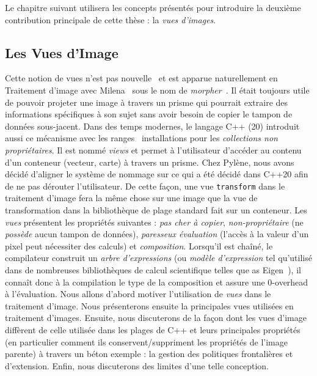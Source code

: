 Le chapitre suivant utilisera les concepts présentés pour introduire la deuxième contribution principale de cette thèse : la
\emph{vues d'images}.


\subsection*{Les Vues d'Image}


Cette notion de vues n'est pas nouvelle~\parencite{novak.1997.reuse} et est apparue naturellement en Traitement d'image avec
Milena~\parencite{geraud.2012.ipolmeeting,levillain.2010.icip} sous le nom de
\emph{morpher}~\parencite{levillain.2009.ismm, geraud.2012.hdr}. Il était toujours utile de pouvoir projeter une image
à travers un prisme qui pourrait extraire des informations spécifiques à son sujet sans avoir besoin de copier le tampon de données sous-jacent. Dans
des temps modernes, le langage C++ (20) introduit aussi ce mécanisme avec les ranges~\parencite{niebler.2014.ranges}
installations pour les \emph{collections non propriétaires}. Il est nommé \emph{views} et permet à l'utilisateur d'accéder au contenu d'un
conteneur (vecteur, carte) à travers un prisme. Chez Pylène, nous avons décidé d'aligner le système de nommage sur ce qui a été décidé dans
C++20 afin de ne pas dérouter l'utilisateur. De cette façon, une vue \texttt{transform} dans le traitement d'image fera la même chose
sur une image que la vue de transformation dans la bibliothèque de plage standard fait sur un conteneur. Les \emph{vues} présentent les
propriétés suivantes : \emph{pas cher à copier}, \emph{non-propriétaire} (ne \emph{possède} aucun tampon de données), \emph{paresseux
  évaluation} (l'accès à la valeur d'un pixel peut nécessiter des calculs) et \emph{composition}. Lorsqu'il est chaîné, le compilateur
construit un \emph{arbre d'expressions} (ou \emph{modèle d'expression} tel qu'utilisé dans de nombreuses bibliothèques de calcul scientifique telles que
as Eigen~\parencite{guennebaud.2010.eigen}), il connaît donc à la compilation le type de la composition et assure une
0-overhead à l'évaluation. Nous allons d'abord motiver l'utilisation de \emph{vues} dans le traitement d'image. Nous présenterons ensuite la
principales vues utilisées en traitement d'images. Ensuite, nous discuterons de la façon dont les vues d'image diffèrent de celle utilisée dans les plages de C++ et
leurs principales propriétés (en particulier comment ils conservent/suppriment les propriétés de l'image parente) à travers un béton
exemple : la gestion des politiques frontalières et d'extension. Enfin, nous discuterons des limites d'une telle conception.